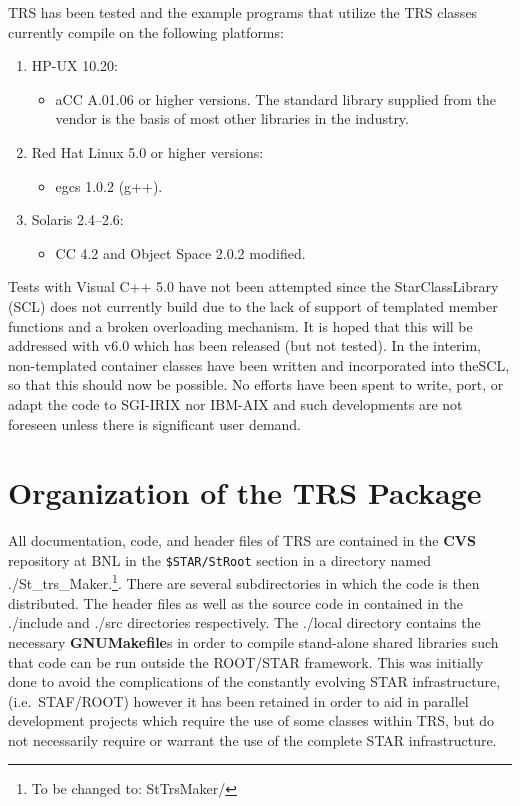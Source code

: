 \documentclass[twoside]{article}
\newcommand{\name}[1]{\textsf{#1}}%
\newcommand{\comp}[1]{\texttt{#1}}%
\begin{document}
\name{TRS} has been tested and the example programs that 
utilize the \name{TRS} classes currently compile on the following 
platforms:
\begin{enumerate}
\item HP-UX 10.20: 
  \begin{itemize}
    \item aCC A.01.06 or higher versions. The standard library
      supplied from the vendor is the basis of most other libraries
      in the industry. 
  \end{itemize}
\item Red Hat Linux 5.0 or higher versions: 
  \begin{itemize}
    \item egcs 1.0.2 (g++).
  \end{itemize}
\item Solaris 2.4--2.6: 
  \begin{itemize}
    \item CC 4.2 and Object Space 2.0.2 modified. 
  \end{itemize}
\end{enumerate}
Tests with Visual C++ 5.0 have not been attempted since the
StarClassLibrary (SCL)  does
not currently build due to the lack of support of 
templated member functions and a broken overloading mechanism.  It
is hoped that this will be addressed with v6.0 which has been released
(but not tested).  In the interim, non-templated container classes
have been written and incorporated into the\name{SCL}, so that this
should now be possible.
No efforts have been spent to write, port, or adapt the code
to SGI-IRIX  
nor IBM-AIX and such developments are not foreseen  unless there is
significant user demand.  

\section{Organization of the \name{TRS} Package}

All documentation, code, and header files of \name{TRS} are contained in
the {\bf CVS} repository at BNL in the \comp{\$STAR/StRoot} section
in a
directory named \name{./St\_trs\_Maker}.\footnote{To be changed to: 
        \name{StTrsMaker/}}.  
There are several subdirectories
in  which  the code is then distributed.  The header files as well
as the source code in contained in the \name{./include} and \name{./src}
directories respectively.  The \name{./local} directory contains the
necessary {\bf GNUMakefile}s in order to compile stand-alone shared
libraries such that code can be run outside the ROOT/STAR framework.
This was initially done to avoid the complications of the constantly
evolving STAR infrastructure, (i.e.~STAF/ROOT)  
however it has been retained in order to aid in parallel development
projects which require the use of some classes within \name{TRS}, but do
not necessarily require or warrant the use of the complete STAR 
infrastructure.  
\end{document}
